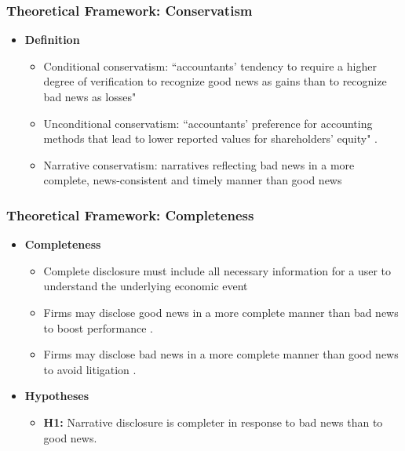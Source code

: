 \documentclass{beamer}
\begin{document}
\begin{frame}
\frametitle{Theoretical Framework: Conservatism}
\begin{itemize}
		
\item \textbf{Definition}

	\begin{itemize}
		\item Conditional conservatism: ``accountants' tendency to require a higher degree of verification to recognize good news as gains than to recognize bad news as losses" \citep*[p. 7]{basuConservatismPrincipleAsymmetric1997}
		\item Unconditional conservatism: ``accountants' preference for accounting methods that lead to lower reported values for shareholders' equity" \citep*[p. 8]{basuConservatismPrincipleAsymmetric1997}.
		\item Narrative conservatism: narratives reflecting bad news in a more complete, news-consistent and timely manner than good news
	\end{itemize}

\end{itemize}
\end{frame}
\begin{frame}
	\frametitle{Theoretical Framework: Completeness}
	\begin{itemize}
\item \textbf{Completeness}

\begin{itemize}
	\item Complete disclosure must include all necessary information for a user to understand the underlying economic event \citep{fasbConceptualFrameworkFinancial2018}
	\item Firms may disclose good news in a more complete manner than bad news to boost performance \citep{teohEarningsManagementUnderperformance1998, langVoluntaryDisclosureEquity2000}.
	\item Firms may disclose bad news in a more complete manner than good news to avoid litigation \citep{skinnerWhyFirmsVoluntarily1994, skinnerEarningsDisclosuresStockholder1997}.
\end{itemize}

\item \textbf{Hypotheses}

\begin{itemize}
	\item  \textbf{H1:} Narrative disclosure is completer in response to bad news than to good news.
\end{itemize}

\end{itemize}
\end{frame}
\end{document}

